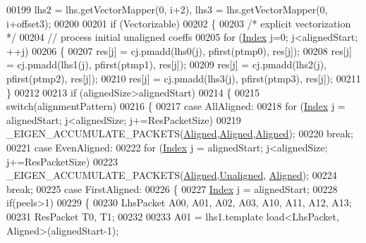 \begin{DoxyCode}
{00199                      lhs2 = lhs.getVectorMapper(0, i+2),   lhs3 = lhs.getVectorMapper(0, i+offset3);
00200 
00201     \textcolor{keywordflow}{if} (Vectorizable)
00202     \{
00203       \textcolor{comment}{/* explicit vectorization */}
00204       \textcolor{comment}{// process initial unaligned coeffs}
00205       \textcolor{keywordflow}{for} (\hyperlink{namespace_eigen_a62e77e0933482dafde8fe197d9a2cfde}{Index} j=0; j<alignedStart; ++j)
00206       \{
00207         res[j] = cj.pmadd(lhs0(j), pfirst(ptmp0), res[j]);
00208         res[j] = cj.pmadd(lhs1(j), pfirst(ptmp1), res[j]);
00209         res[j] = cj.pmadd(lhs2(j), pfirst(ptmp2), res[j]);
00210         res[j] = cj.pmadd(lhs3(j), pfirst(ptmp3), res[j]);
00211       \}
00212 
00213       \textcolor{keywordflow}{if} (alignedSize>alignedStart)
00214       \{
00215         \textcolor{keywordflow}{switch}(alignmentPattern)
00216         \{
00217           \textcolor{keywordflow}{case} AllAligned:
00218             \textcolor{keywordflow}{for} (\hyperlink{namespace_eigen_a62e77e0933482dafde8fe197d9a2cfde}{Index} j = alignedStart; j<alignedSize; j+=ResPacketSize)
00219               \_EIGEN\_ACCUMULATE\_PACKETS(\hyperlink{group__enums_gga45fe06e29902b7a2773de05ba27b47a1ad37d4c71425bb286e9b4103830538fbf}{Aligned},\hyperlink{group__enums_gga45fe06e29902b7a2773de05ba27b47a1ad37d4c71425bb286e9b4103830538fbf}{Aligned},\hyperlink{group__enums_gga45fe06e29902b7a2773de05ba27b47a1ad37d4c71425bb286e9b4103830538fbf}{Aligned});
00220             \textcolor{keywordflow}{break};
00221           \textcolor{keywordflow}{case} EvenAligned:
00222             \textcolor{keywordflow}{for} (\hyperlink{namespace_eigen_a62e77e0933482dafde8fe197d9a2cfde}{Index} j = alignedStart; j<alignedSize; j+=ResPacketSize)
00223               \_EIGEN\_ACCUMULATE\_PACKETS(\hyperlink{group__enums_gga45fe06e29902b7a2773de05ba27b47a1ad37d4c71425bb286e9b4103830538fbf}{Aligned},\hyperlink{group__enums_gga45fe06e29902b7a2773de05ba27b47a1ac935220b4c844108e183ebe30a4d5204}{Unaligned},
      \hyperlink{group__enums_gga45fe06e29902b7a2773de05ba27b47a1ad37d4c71425bb286e9b4103830538fbf}{Aligned});
00224             \textcolor{keywordflow}{break};
00225           \textcolor{keywordflow}{case} FirstAligned:
00226           \{
00227             \hyperlink{namespace_eigen_a62e77e0933482dafde8fe197d9a2cfde}{Index} j = alignedStart;
00228             \textcolor{keywordflow}{if}(peels>1)
00229             \{
00230               LhsPacket A00, A01, A02, A03, A10, A11, A12, A13;
00231               ResPacket T0, T1;
00232 
00233               A01 = lhs1.template load<LhsPacket, Aligned>(alignedStart-1);
}
\end{DoxyCode}
